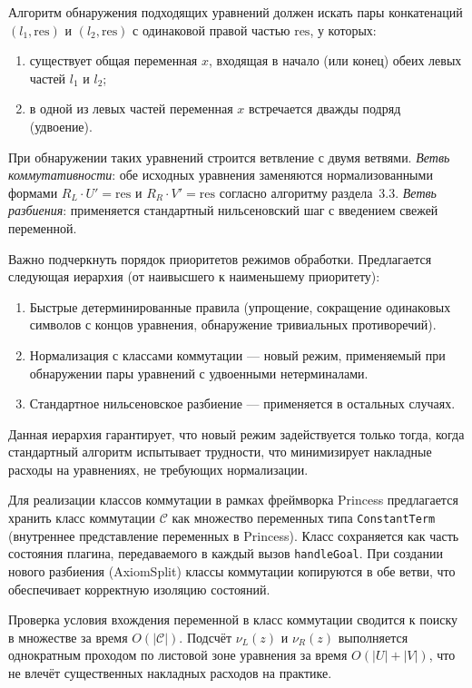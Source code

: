 \documentclass[14pt, russian]{scrartcl}
\begin{document}
Алгоритм обнаружения подходящих уравнений должен искать пары конкатенаций
$(l_1, \text{res})$ и $(l_2, \text{res})$ с одинаковой правой частью $\text{res}$,
у которых:
\begin{enumerate}
\item существует общая переменная $x$, входящая в начало (или конец)
  обеих левых частей $l_1$ и $l_2$;
\item в одной из левых частей переменная $x$ встречается дважды подряд (удвоение).
\end{enumerate}

При обнаружении таких уравнений строится ветвление с двумя ветвями.
\emph{Ветвь коммутативности}: обе исходных уравнения заменяются нормализованными
формами $R_L \cdot U' = \text{res}$ и $R_R \cdot V' = \text{res}$ согласно
алгоритму раздела~3.3.
\emph{Ветвь разбиения}: применяется стандартный нильсеновский шаг с введением
свежей переменной.

Важно подчеркнуть порядок приоритетов режимов обработки. Предлагается следующая
иерархия (от наивысшего к наименьшему приоритету):
\begin{enumerate}
\item Быстрые детерминированные правила (упрощение, сокращение одинаковых
  символов с концов уравнения, обнаружение тривиальных противоречий).
\item Нормализация с классами коммутации --- новый режим, применяемый при
  обнаружении пары уравнений с удвоенными нетерминалами.
\item Стандартное нильсеновское разбиение --- применяется в остальных случаях.
\end{enumerate}

Данная иерархия гарантирует, что новый режим задействуется только тогда,
когда стандартный алгоритм испытывает трудности, что минимизирует накладные
расходы на уравнениях, не требующих нормализации.

Для реализации классов коммутации в рамках фреймворка Princess предлагается
хранить класс коммутации $\mathcal{C}$ как множество переменных типа
\texttt{ConstantTerm} (внутреннее представление переменных в Princess).
Класс сохраняется как часть состояния плагина, передаваемого в каждый вызов
\texttt{handleGoal}. При создании нового разбиения (AxiomSplit) классы
коммутации копируются в обе ветви, что обеспечивает корректную изоляцию
состояний.

Проверка условия вхождения переменной в класс коммутации сводится к поиску
в множестве за время $O(|\mathcal{C}|)$. Подсчёт $\nu_L(z)$ и $\nu_R(z)$
выполняется однократным проходом по листовой зоне уравнения за время
$O(|U| + |V|)$, что не влечёт существенных накладных расходов на практике.
\end{document}
